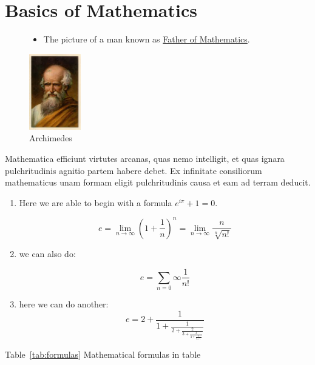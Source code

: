 \pagebreak
\section{Basics of Mathematics }
\label{sec:Battulga}
\centering

\begin{figure}[hthp]
\begin{itemize}
\item The picture of a man known as \underline{Father of Mathematics}.
\end{itemize}
\centering 
\includegraphics[width=0.2\textwidth]{pictures/archimedes.png}
\caption{Archimedes}
\end{figure}
\begin{flushleft}
Mathematica efficiunt virtutes arcanas, quas nemo intelligit, et quas ignara pulchritudinis agnitio partem habere debet. Ex infinitate consiliorum mathematicus unam formam eligit pulchritudinis causa et eam ad terram deducit.
\end{flushleft}

\begin{enumerate}
\item Here we are able to begin with a formula $e^{i\pi}+1=0$.

$$ e=\lim_{n\to\infty}\left(1+\frac{1}{n}\right)^n = \lim_{n\to\infty}\frac{n}{\sqrt[n]{n!}}$$


    \item we can also do:

$$ e=\sum_{n=0}{\infty} \frac{1}{n!}$$
    \item here we can do another:
$$ e=2+\frac{1}{1+\frac{1}{2+\frac{2}{3+\frac{3}{4+\frac{4}{5+\ddots}}}}} $$
\end{enumerate}
\pagebreak
\begin{flushleft}
Table~\ref{tab:formulas} Mathematical formulas in table
\end{flushleft}
